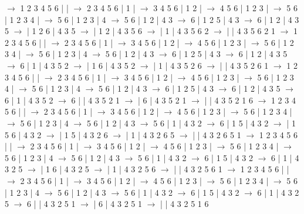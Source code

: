 \documentclass{article}
\begin{document}
\newline
 $\rightarrow$ 1 2 3 4 5 6 |  |  $\rightarrow$ 2 3 4 5 6 | 1 |  $\rightarrow$ 3 4 5 6 | 1 2 |  $\rightarrow$ 4 5 6 | 1 2 3 |  $\rightarrow$ 5 6 | 1 2 3 4 |  $\rightarrow$ 5 6 | 1 2 3 | 4 $\rightarrow$ 5 6 | 1 2 | 4 3 $\rightarrow$ 6 | 1 2 5 | 4 3 $\rightarrow$ 6 | 1 2 | 4 3 5 $\rightarrow$  | 1 2 6 | 4 3 5 $\rightarrow$  | 1 2 | 4 3 5 6 $\rightarrow$  | 1 | 4 3 5 6 2 $\rightarrow$  |  | 4 3 5 6 2 1
\newline
 $\rightarrow$ 1 2 3 4 5 6 |  |  $\rightarrow$ 2 3 4 5 6 | 1 |  $\rightarrow$ 3 4 5 6 | 1 2 |  $\rightarrow$ 4 5 6 | 1 2 3 |  $\rightarrow$ 5 6 | 1 2 3 4 |  $\rightarrow$ 5 6 | 1 2 3 | 4 $\rightarrow$ 5 6 | 1 2 | 4 3 $\rightarrow$ 6 | 1 2 5 | 4 3 $\rightarrow$ 6 | 1 2 | 4 3 5 $\rightarrow$ 6 | 1 | 4 3 5 2 $\rightarrow$  | 1 6 | 4 3 5 2 $\rightarrow$  | 1 | 4 3 5 2 6 $\rightarrow$  |  | 4 3 5 2 6 1
\newline
 $\rightarrow$ 1 2 3 4 5 6 |  |  $\rightarrow$ 2 3 4 5 6 | 1 |  $\rightarrow$ 3 4 5 6 | 1 2 |  $\rightarrow$ 4 5 6 | 1 2 3 |  $\rightarrow$ 5 6 | 1 2 3 4 |  $\rightarrow$ 5 6 | 1 2 3 | 4 $\rightarrow$ 5 6 | 1 2 | 4 3 $\rightarrow$ 6 | 1 2 5 | 4 3 $\rightarrow$ 6 | 1 2 | 4 3 5 $\rightarrow$ 6 | 1 | 4 3 5 2 $\rightarrow$ 6 |  | 4 3 5 2 1 $\rightarrow$  | 6 | 4 3 5 2 1 $\rightarrow$  |  | 4 3 5 2 1 6
\newline
 $\rightarrow$ 1 2 3 4 5 6 |  |  $\rightarrow$ 2 3 4 5 6 | 1 |  $\rightarrow$ 3 4 5 6 | 1 2 |  $\rightarrow$ 4 5 6 | 1 2 3 |  $\rightarrow$ 5 6 | 1 2 3 4 |  $\rightarrow$ 5 6 | 1 2 3 | 4 $\rightarrow$ 5 6 | 1 2 | 4 3 $\rightarrow$ 5 6 | 1 | 4 3 2 $\rightarrow$ 6 | 1 5 | 4 3 2 $\rightarrow$  | 1 5 6 | 4 3 2 $\rightarrow$  | 1 5 | 4 3 2 6 $\rightarrow$  | 1 | 4 3 2 6 5 $\rightarrow$  |  | 4 3 2 6 5 1
\newline
 $\rightarrow$ 1 2 3 4 5 6 |  |  $\rightarrow$ 2 3 4 5 6 | 1 |  $\rightarrow$ 3 4 5 6 | 1 2 |  $\rightarrow$ 4 5 6 | 1 2 3 |  $\rightarrow$ 5 6 | 1 2 3 4 |  $\rightarrow$ 5 6 | 1 2 3 | 4 $\rightarrow$ 5 6 | 1 2 | 4 3 $\rightarrow$ 5 6 | 1 | 4 3 2 $\rightarrow$ 6 | 1 5 | 4 3 2 $\rightarrow$ 6 | 1 | 4 3 2 5 $\rightarrow$  | 1 6 | 4 3 2 5 $\rightarrow$  | 1 | 4 3 2 5 6 $\rightarrow$  |  | 4 3 2 5 6 1
\newline
 $\rightarrow$ 1 2 3 4 5 6 |  |  $\rightarrow$ 2 3 4 5 6 | 1 |  $\rightarrow$ 3 4 5 6 | 1 2 |  $\rightarrow$ 4 5 6 | 1 2 3 |  $\rightarrow$ 5 6 | 1 2 3 4 |  $\rightarrow$ 5 6 | 1 2 3 | 4 $\rightarrow$ 5 6 | 1 2 | 4 3 $\rightarrow$ 5 6 | 1 | 4 3 2 $\rightarrow$ 6 | 1 5 | 4 3 2 $\rightarrow$ 6 | 1 | 4 3 2 5 $\rightarrow$ 6 |  | 4 3 2 5 1 $\rightarrow$  | 6 | 4 3 2 5 1 $\rightarrow$  |  | 4 3 2 5 1 6
\end{document}
